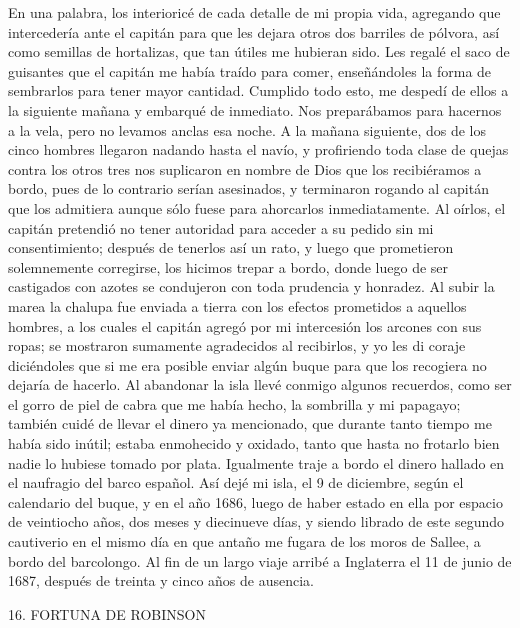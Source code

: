 \documentclass{novela}
\begin{document}
    En una palabra, los interioricé de cada detalle de mi propia vida, agregando que intercedería ante el capitán para que les dejara otros dos barriles de pólvora, así como semillas de hortalizas, que tan útiles me hubieran sido. Les regalé el saco de guisantes que el capitán me había traído para comer, enseñándoles la forma de sembrarlos para tener mayor cantidad.
    Cumplido todo esto, me despedí de ellos a la siguiente mañana y embarqué de inmediato. Nos preparábamos para hacernos a la vela, pero no levamos anclas esa noche. A la mañana siguiente, dos de los cinco hombres llegaron nadando hasta el navío, y profiriendo toda clase de quejas contra los otros tres nos suplicaron en nombre de Dios que los recibiéramos a bordo, pues de lo contrario serían asesinados, y terminaron rogando al capitán que los admitiera aunque sólo fuese para ahorcarlos inmediatamente.
    Al oírlos, el capitán pretendió no tener autoridad para acceder a su pedido sin mi consentimiento; después de tenerlos así un rato, y luego que prometieron solemnemente corregirse, los hicimos trepar a bordo, donde luego de ser castigados con azotes se condujeron con toda prudencia y honradez.
    Al subir la marea la chalupa fue enviada a tierra con los efectos prometidos a aquellos hombres, a los cuales el capitán agregó por mi intercesión los arcones con sus ropas; se mostraron sumamente agradecidos al recibirlos, y yo les di coraje diciéndoles que si me era posible enviar algún buque para que los recogiera no dejaría de hacerlo.
    Al abandonar la isla llevé conmigo algunos recuerdos, como ser el gorro de piel de cabra que me había hecho, la sombrilla y mi papagayo; también cuidé de llevar el dinero ya mencionado, que durante tanto tiempo me había sido inútil; estaba enmohecido y oxidado, tanto que hasta no frotarlo bien nadie lo hubiese tomado por plata. Igualmente traje a bordo el dinero hallado en el naufragio del barco español.
    Así dejé mi isla, el 9 de diciembre, según el calendario del buque, y en el año 1686, luego de haber estado en ella por espacio de veintiocho años, dos meses y diecinueve días, y siendo librado de este segundo cautiverio en el mismo día en que antaño me fugara de los moros de Sallee, a bordo del barcolongo.
    Al fin de un largo viaje arribé a Inglaterra el 11 de junio de 1687, después de treinta y cinco años de ausencia.







    16. FORTUNA DE ROBINSON
\end{document}
